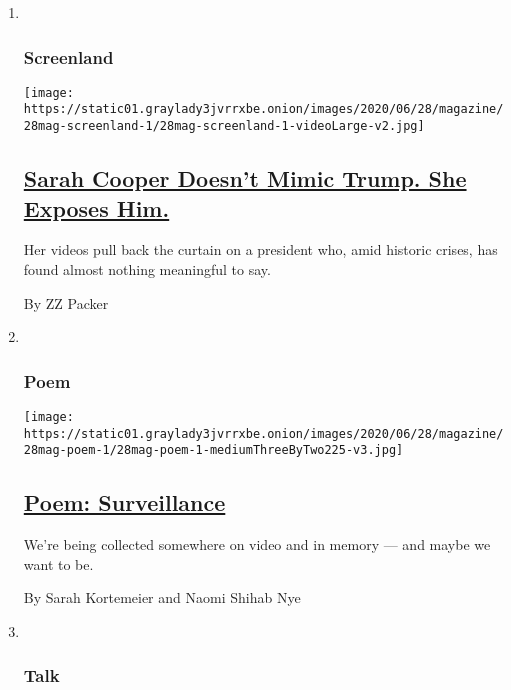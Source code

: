 \begin{enumerate}
\def\labelenumi{\arabic{enumi}.}
\item ~
  \hypertarget{screenland}{%
  \subsubsection{Screenland}\label{screenland}}

  \texttt{[image: https://static01.graylady3jvrrxbe.onion/images/2020/06/28/magazine/28mag-screenland-1/28mag-screenland-1-videoLarge-v2.jpg]}

  \hypertarget{sarah-cooper-doesnt-mimic-trump-she-exposes-him}{%
  \subsection{\texorpdfstring{\href{/2020/06/25/magazine/sarah-cooper-doesnt-mimic-trump-she-exposes-him.html}{Sarah
  Cooper Doesn't Mimic Trump. She Exposes
  Him.}}{Sarah Cooper Doesn't Mimic Trump. She Exposes Him.}}\label{sarah-cooper-doesnt-mimic-trump-she-exposes-him}}

  Her videos pull back the curtain on a president who, amid historic
  crises, has found almost nothing meaningful to say.

  By ZZ Packer
\item ~
  \hypertarget{poem}{%
  \subsubsection{Poem}\label{poem}}

  \texttt{[image: https://static01.graylady3jvrrxbe.onion/images/2020/06/28/magazine/28mag-poem-1/28mag-poem-1-mediumThreeByTwo225-v3.jpg]}

  \hypertarget{poem-surveillance}{%
  \subsection{\texorpdfstring{\href{/2020/06/25/magazine/poem-surveillance.html}{Poem:
  Surveillance}}{Poem: Surveillance}}\label{poem-surveillance}}

  We're being collected somewhere on video and in memory --- and maybe
  we want to be.

  By Sarah Kortemeier and Naomi Shihab Nye
\item ~
  \hypertarget{talk}{%
  \subsubsection{Talk}\label{talk}}


\end{enumerate}
